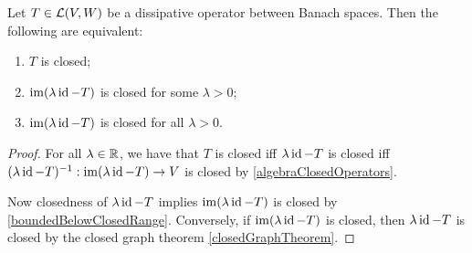 \begin{proposition} \label{closureDissipativeOperator}
Let $T\in \operatorname{\mathcal{L}}(V, W)$ be a dissipative operator between Banach spaces. Then the following are equivalent:
\begin{enumerate}
\item $T$ is closed;
\item $\operatorname{im}(\lambda\operatorname{id} - T)$ is closed for some $\lambda > 0$;
\item $\operatorname{im}(\lambda\operatorname{id} - T)$ is closed for all $\lambda > 0$.
\end{enumerate}
\end{proposition}
\begin{proof}
For all $\lambda\in\mathbb{R}$, we have that $T$ is closed iff $\lambda\operatorname{id} - T$ is closed iff $(\lambda\operatorname{id} - T)^{-1}: \operatorname{im}(\lambda\operatorname{id} - T) \to V$ is closed by \ref{algebraClosedOperators}.

Now closedness of $\lambda\operatorname{id} - T$ implies $\operatorname{im}(\lambda\operatorname{id} - T)$ is closed by \ref{boundedBelowClosedRange}. Conversely, if $\operatorname{im}(\lambda\operatorname{id} - T)$ is closed, then $\lambda\operatorname{id} - T$ is closed by the closed graph theorem \ref{closedGraphTheorem}.
\end{proof}

